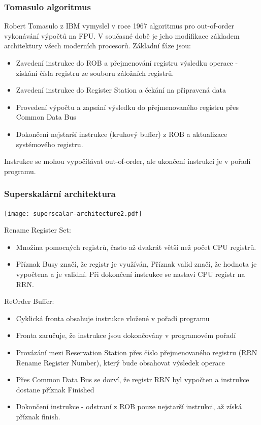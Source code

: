 \documentclass{beamer}
\begin{document}
\begin{frame}
\frametitle{Tomasulo algoritmus}

Robert Tomasulo z IBM vymyslel v roce 1967 algoritmus pro out-of-order vykonávání výpočtů na FPU.
V současné době je jeho modifikace základem architektury všech moderních procesorů.
Základní fáze jsou:
\begin{itemize}
\item Zavedení instrukce do ROB a přejmenování registru výsledku operace - získání čísla registru ze souboru záložních registrů. 
\item Zavedení instrukce do Register Station a čekání na připravená data
\item Provedení výpočtu a zapsání výsledku do přejmenovaného registru přes Common Data Bus
\item Dokončení nejstarší instrukce (kruhový buffer) z ROB a aktualizace systémového registru.
\end{itemize}
Instrukce se mohou vypočítávat out-of-order, ale ukončení instrukcí je v pořadí programu.
\end{frame}

\begin{frame}
\frametitle{Superskalární architektura}

\begin{center}
\texttt{[image: superscalar-architecture2.pdf]}
\end{center}

\scriptsize
Rename Register Set:
\begin{itemize}
\item Množina pomocných registrů, často až dvakrát větší než počet CPU registrů.
\item Příznak Busy značí, že registr je využíván, Příznak valid značí, že hodnota je vypočtena a je validní. Při dokončení instrukce se nastaví CPU registr na RRN.
\end{itemize}

ReOrder Buffer:
\begin{itemize}
\item Cyklická fronta obsahuje instrukce vložené v pořadí programu
\item Fronta zaručuje, že instrukce jsou dokončovány v programovém pořadí
\item Provázání mezi Reservation Station přes číslo přejmenovaného registru (RRN Rename Register Number), který bude obsahovat výsledek operace
\item Přes Common Data Bus se dozví, že registr RRN byl vypočten a instrukce dostane příznak Finished
\item Dokončení instrukce - odstraní z ROB pouze nejstarší instrukci, až získá příznak finish.
\end{itemize}


\end{frame}
\end{document}
